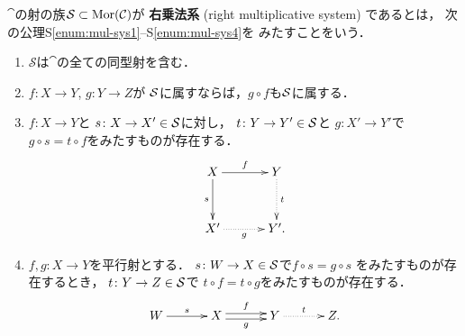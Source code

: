 \begin{Definition}\label{DFN:mul-sys}
    \(\cat\)の射の族\(\mathcal{S}\subset\mathop{\mathrm{Mor}}\nolimits(\mathcal{C})\)が
    \textbf{右乗法系} (right multiplicative system) であるとは，
    次の公理S\ref{enum:mul-sys1}--S\ref{enum:mul-sys4}を
    みたすことをいう．
    \begin{enumerate}[S1]
        \item \(\mathcal{S}\)は\(\cat\)の全ての同型射を含む．
        \label{enum:mul-sys1}
        \item \(f\colon X\to Y\), \(g\colon Y\to Z\)が
        \(\mathcal{S}\)に属すならば，\(g\circ{f}\)も\(\mathcal{S}\)に属する．
        \label{enum:mul-sys2}
        \item \(f\colon{X}\to{Y}\)と
        \(s\colon{X}\to{X'}\in\mathcal{S}\)に対し，
        \(t\colon{Y}\to{Y'}\in\mathcal{S}\)と
        \(g\colon{X'}\to{Y'}\)で
        \(g\circ{s}=t\circ{f}\)をみたすものが存在する．
        \[\vcenter{\xymatrix@C=32pt@R=32pt{
        X
        \ar[r]^-{f}
        \ar[d]_-{s}
        &Y
        \ar@{.>}[d]^-{t}
        \\
        X'
        \ar@{.>}[r]_-{g}
        &
        Y'.
        }}\]
        \label{enum:mul-sys3}
        \item \(f,g\colon{X}\to{Y}\)を平行射とする．
        \(s\colon{W}\to{X}\in\mathcal{S}\)で\(f\circ{s}=g\circ{s}\)
        をみたすものが存在するとき，
        \(t\colon{Y}\to{Z}\in\mathcal{S}\)で
        \(t\circ{f}=t\circ{g}\)をみたすものが存在する．
        \[\vcenter{\xymatrix@C=32pt@R=32pt{
        W
        \ar[r]^-{s}
        &
        X
        \ar@<0.5ex>[r]^-{f}
        \ar@<-0.5ex>[r]_-{g}
        &Y
        \ar@{.>}[r]^-{t}
        &Z.
        }}\]\label{enum:mul-sys4}
    \end{enumerate}
\end{Definition}

